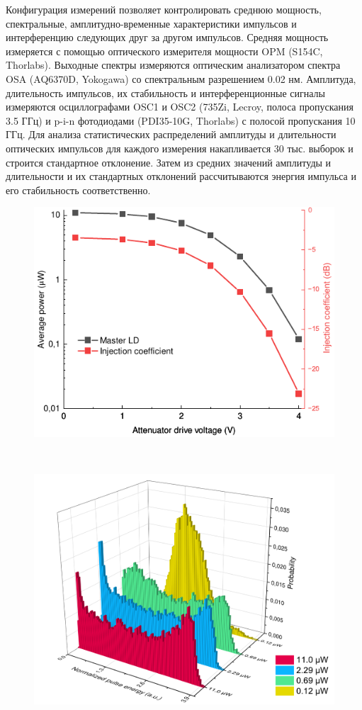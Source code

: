 Конфигурация измерений позволяет контролировать среднюю мощность, спектральные, амплитудно-временные характеристики импульсов и интерференцию следующих друг за другом импульсов. Средняя мощность измеряется с помощью оптического измерителя мощности OPM (S154C, Thorlabs). Выходные спектры измеряются оптическим анализатором спектра OSA (AQ6370D, Yokogawa) со спектральным разрешением 0.02 нм. Амплитуда, длительность импульсов, их стабильность и интерференционные сигналы измеряются осциллографами OSC1 и OSC2 (735Zi, Lecroy, полоса пропускания 3.5 ГГц) и p-i-n фотодиодами (PDI35-10G, Thorlabs) с полосой пропускания 10 ГГц. Для анализа статистических распределений амплитуды и длительности оптических импульсов для каждого измерения накапливается 30 тыс. выборок и строится стандартное отклонение. Затем из средних значений амплитуды и длительности и их стандартных отклонений рассчитываются энергия импульса и его стабильность соответственно.
\begin{figure}
	\centering
	\includegraphics[width=\linewidth]{images/master_power.pdf}
	\caption{}
\end{figure}
\
\begin{figure}
	\centering
	\includegraphics[width=\linewidth]{images/hist_initial.pdf}
	\caption{}
\end{figure}

